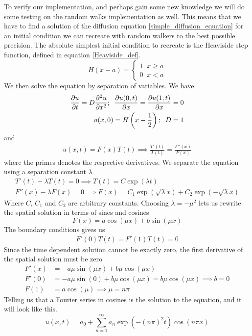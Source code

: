 To verify our implementation, and perhaps gain some new knowledge we will do some testing on the random walks implementation as well. 
This means that we have to find a solution of the diffusion equation \ref{simple_diffusion_equation} for an initial condition we can recreate with random walkers to the best possible precision. 
The absolute simplest initial condition to recreate is the Heaviside step function, defined in equation \ref{Heaviside_def}. 
\begin{equation}\label{Heaviside_def}
 H(x-a) = \begin{cases}
           1\;\;x\geq a\\
           0\;\;x<a
          \end{cases}
\end{equation}
We then solve the equation by separation of variables. We have
\begin{align*}
 \frac{\partial u}{\partial t} = D\frac{\partial^2 u}{\partial x^2};\;\; \frac{\partial u(0,t)}{\partial x} = \frac{\partial u(1,t)}{\partial x} = 0 \\
 u(x,0) = H\left(x-\frac{1}{2}\right);\;\; D = 1
\end{align*}
and
\begin{align*}
 u(x,t) = F(x)T(t) \implies \frac{T'(t)}{T(t)} = \frac{F''(x)}{F(x)}
\end{align*}
where the primes denotes the respective derivatives. We separate the equation using a separation constant $\lambda$
\begin{align*}
 T'(t)-\lambda T(t) = 0 \implies T(t) = C\exp(\lambda t)\\
 F''(x) -\lambda F(x) = 0 \implies F(x) = C_1\exp(\sqrt{\lambda}x) + C_2\exp(-\sqrt{\lambda}x)
\end{align*}
Where $C$, $C_1$ and $C_2$ are arbitrary constants. 
Choosing $\lambda = -\mu^2$ lets us rewrite the spatial solution in terms of sines and cosines
\begin{equation*}
 F(x) = a\cos(\mu x) + b\sin(\mu x)
\end{equation*}
The boundary conditions gives us 
\begin{align*}
 F'(0)T(t) = F'(1)T(t) = 0
\end{align*}
Since the time dependent solution cannot be exactly zero, the first derivative of the spatial solution must be zero
\begin{align*}
 F'(x) &= -a\mu\sin(\mu x) + b\mu\cos(\mu x) \\
 F'(0) &= -a \mu\sin(0) + b\mu\cos(\mu x) = b\mu\cos(\mu x) \implies b=0 \\
 F(1) &= a\cos(\mu) \implies \mu = n\pi
\end{align*}
Telling us that a Fourier series in cosines is the solution to the equation, and it will look like this.
\begin{equation}
 u(x,t) = a_0 + \sum\limits_{n=1}^\infty a_n\exp\left(-(n\pi)^2t\right)\cos(n\pi x)
\end{equation}


